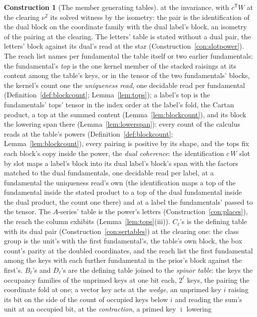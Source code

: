 \documentclass[11pt]{article}
\theoremstyle{definition}
\newtheorem{construction}{Construction}
\begin{document}
\begin{construction}[The member generating tables]
at the invariance, with $c^{\mathsf T}W$ at the clearing
$\nu^{2}$ its solved witness by the isometry: the pair is the identification of the
dual block on the coordinate family with the dual label's block,
an isometry of the pairing at the clearing. The letters' table
is stated without a dual pair, the letters' block against its
dual's read at the star (Construction~\ref{con:slotpower}). The reach list names
per fundamental the table itself or two earlier fundamentals: the
fundamental's \emph{top} is the one kernel member of the stacked
raisings at its content among the table's keys, or in the tensor
of the two fundamentals' blocks, the kernel's count one the
\emph{uniqueness read}, one decidable read per fundamental
(Definition~\ref{def:blockcount}; Lemma~\ref{lem:tops}); a label's
top is the fundamentals' tops' tensor in the index order at the
label's fold, the Cartan product, a top at the summed content
(Lemma~\ref{lem:blockcount}), and its block the lowering span there
(Lemma~\ref{lem:lowerspan}): every count of the calculus reads at
the table's powers (Definition~\ref{def:blockcount};
Lemma~\ref{lem:blockcount}), every pairing is positive by its
shape, and the tops fix each block's copy inside the power, the
\emph{dual coherence}: the identification $c\,W$ slot by slot
maps a label's block into its dual label's block's span with
the factors matched to the dual fundamentals, one decidable read
per label, at a fundamental the uniqueness read's own (the
identification maps a top of the fundamental inside the stated
product to a top of the dual fundamental inside the dual product,
the count one there) and at a label the fundamentals' passed to
the tensor. The $A$-series' table is the power's letters
(Construction~\ref{con:places}), the reach the column exhibits
(Lemma~\ref{lem:tops}(iii)). $C_\ell$'s is the defining table with
its dual pair (Construction~\ref{con:sertables}) at the clearing
one: the class group is the unit's with the first fundamental's,
the table's own block, the box count's parity at the doubled
coordinates, and the reach list the first fundamental among the
keys with each further fundamental in the prior's block against
the first's.
$B_\ell$'s and $D_\ell$'s are the defining table joined to the
\emph{spinor table}: the keys the occupancy families of the
unprimed keys at one bit each, $2^\ell$ keys, the pairing the
coordinate fold at one; a vector key acts at the \emph{wedge}, an
unprimed key $i$ raising its bit on the side of the count of
occupied keys below $i$ and reading the sum's unit at an occupied
bit, at the \emph{contraction}, a primed key $\bar\imath$ lowering

\end{construction}
\end{document}
